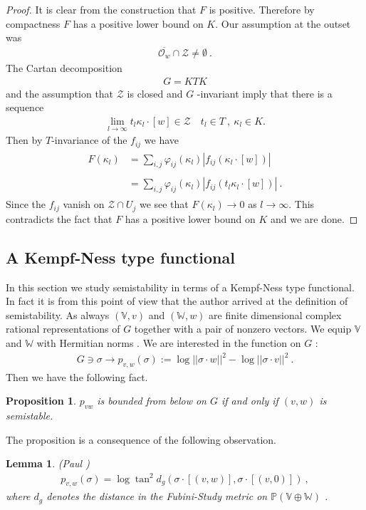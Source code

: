 \documentclass[12pt]{amsart}
\newtheorem{proposition}{Proposition}
\newtheorem{lemma}{Lemma}
\numberwithin{equation}{section}
\numberwithin{remark}{section}
\numberwithin{theorem}{section}
\numberwithin{proposition}{section}
\numberwithin{definition}{section}
\numberwithin{lemma}{section}
\numberwithin{claim}{section}
\numberwithin{corollary}{section}
\numberwithin{conjecture}{section}
\begin{document}
\begin{proof}
 
 It is clear from the construction that $F$ is positive. Therefore by compactness $F$ has a positive lower bound on $K$.
 Our assumption at the outset was 
 \begin{align}
 \overline{\mathcal{O}_w}\cap\mathscr{Z}\neq \emptyset \ .
 \end{align}
 The Cartan decomposition
 \begin{align}
 G=KTK
 \end{align}
 and the assumption that $\mathscr{Z}$ is closed and $G$ -invariant imply that there is a sequence
 \begin{align}
\lim_{l{\ensuremath{\longrightarrow}} \infty} t_l\kappa_l\cdot[w]\in \mathscr{Z}\quad t_l\in T \ , \ \kappa_l\in K .
\end{align}
Then by $T$-invariance of the $f_{ij}$ we have
\begin{align}
\begin{split}
 F(\kappa_l)&=\sum_{i,j}\varphi_{ij}(\kappa_l)|f_{ij}(\kappa_l\cdot [w])| \\
\ \\
&=\sum_{i,j}\varphi_{ij}(\kappa_l)|f_{ij}(t_l\kappa_l\cdot [w])| \ .
\end{split}
\end{align}
Since the $f_{ij}$ vanish on $\mathscr{Z}\cap U_j$  we see that $F(\kappa_l){\ensuremath{\longrightarrow}} 0$ as $l{\ensuremath{\longrightarrow}} \infty$. This contradicts the fact that $F$ has a positive lower bound on $K$ and we are done.
\end{proof}
\subsection{A Kempf-Ness type functional}\label{kempfness} In this section we study semistability in terms of a Kempf-Ness type functional. In fact it is from this point of view that the author arrived at the definition of semistability. As always $(\mathbb{V}, v)$ and $(\mathbb{W}, w)$ are finite dimensional complex rational representations of $G$ together with a pair of nonzero vectors. We equip $\mathbb{V}$ and $\mathbb{W}$ with Hermitian norms . We are interested in the function on $G$  :
 \begin{align}\label{energy}
 G\ni \sigma{\ensuremath{\longrightarrow}} p_{v,w}(\sigma):=\log||\sigma\cdot w||^2-\log||\sigma\cdot v||^2 \ .
 \end{align}
 Then we have the following fact.
 \begin{proposition}\label{vwlowerbound}
\emph{  $p_{vw}$ is bounded from below on $G$ if and only if $(v,w)$ is semistable.}
 \end{proposition}
 The proposition is a consequence of the following observation.
 \begin{lemma}\label{distance}(Paul \cite{paulcm2012})
 \begin{align}
 p_{v,w}(\sigma)=\log\tan^2d_g(\sigma\cdot [(v,w)] , \sigma\cdot [(v,0)]) \ ,
 \end{align}
 \emph{where $d_g$ denotes the distance in the Fubini-Study metric on} $\mathbb{P}(\mathbb{V}\oplus\mathbb{W})$ .
 \end{lemma}
 
\end{document}
